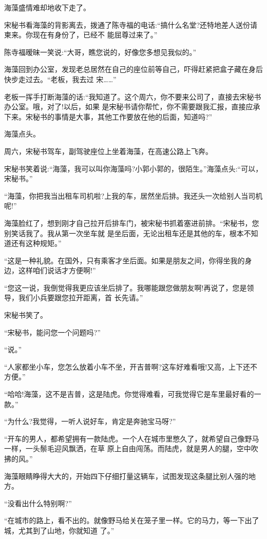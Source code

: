 \documentclass[11pt,a4paper,onecolumn]{article}
\begin{document}
海藻盛情难却地收下走了。

宋秘书看海藻的背影离去，拨通了陈寺福的电话:``搞什么名堂?还特地差人送份请柬来。你现在有身份了，已经不
能屈尊过来了。''

陈寺福暧昧一笑说:``大哥，瞧您说的，好像您多想见我似的。''

海藻回到办公室，发现老总居然在自己的座位前等自己，吓得赶紧把盒子藏在身后快步走过去。``老板，我去过
宋……''

老板一挥手打断海藻的话:``我知道了。这个周六，你不要来公司了，直接去宋秘书办公室。哦，对了!以后，如果
是宋秘书请你帮忙，你不需要跟我汇报，直接应承下来。宋秘书的事情是大事，其他工作要放在他的后面，知道吗?''

海藻点头。

周六，宋秘书驾车，副驾驶座位上坐着海藻，在高速公路上飞奔。

宋秘书笑着说:``海藻，我可以叫你海藻吗?小郭小郭的，很陌生。''海藻点头:``可以，宋秘书。''

``海藻，你把我当出租车司机啦?上我的车，居然坐后排。我还头一次给别人当司机呢!''

海藻脸红了，想到刚才自己拉开后排车门，被宋秘书抓着塞进前排。``宋秘书，您别笑话我了。我从第一次坐车就
是坐后面，无论出租车还是其他的车，根本不知道还有这种规矩。''

``这是一种礼貌。在国外，只有乘客才坐后面。如果是朋友之间，你得坐我的身边，这样咱们说话才方便啊!''

``您这一说，我倒觉得我更应该坐后排了。我哪能跟您做朋友啊!再说了，您是领导，我们小兵要跟您拉开距离，首
长先请。''

宋秘书笑了。

``宋秘书，能问您一个问题吗?''

``说。''

``人家都坐小车，您怎么放着小车不坐，开吉普啊?这车好难看哦!又高，上下还不方便。''

``哈哈!海藻，这不是吉普，这是陆虎。你觉得难看，可我觉得它是车里最好看的一款。''

``为什么?我觉得，一听人说好车，肯定是奔驰宝马呀?''

``开车的男人，都希望拥有一款陆虎。一个人在城市里憋久了，就希望自己像野马一样，一头鬃毛迎风飘洒，在草
原上自由闯荡。而陆虎，就是男人的腿，空中吹拂的风。''

海藻眼睛睁得大大的，开始四下仔细打量这辆车，试图发现这条腿比别人强的地方。

``没看出什么特别啊?''

``在城市的路上，看不出的。就像野马给关在笼子里一样。它的马力，等一下出了城，尤其到了山地，你就知道
了。''
\end{document}
